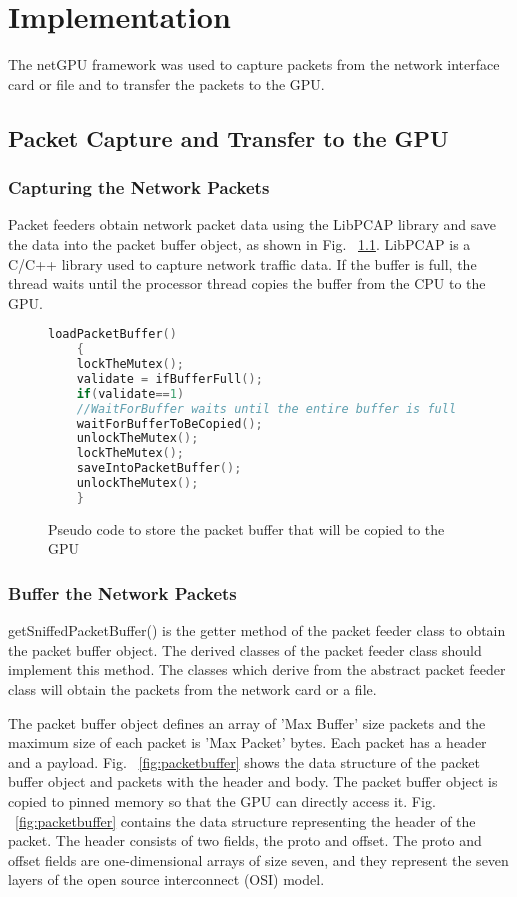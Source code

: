 
\chapter{Implementation}

The netGPU \cite{bib3} framework was used to capture packets from the network interface card or file and to transfer the packets to the GPU.

\section{Packet Capture and Transfer to the GPU}
\vspace{\topsep}
\subsection{Capturing the Network Packets}
Packet feeders obtain network packet data using the LibPCAP library and save the data into the packet buffer object, as shown in Fig. ~\ref{fig:packetfeeder}. LibPCAP \cite{bib4} is a C/C++ library used to capture network traffic data. If the buffer is full, the thread waits until the processor thread copies the buffer from the CPU to the GPU. 

\begin{figure}[H]
	\centering
	\begin{lstlisting}[frame=none,language=C++] 
	loadPacketBuffer()
	{
	lockTheMutex();
	validate = ifBufferFull();
	if(validate==1)
	//WaitForBuffer waits until the entire buffer is full
	waitForBufferToBeCopied();
	unlockTheMutex();
	lockTheMutex();
	saveIntoPacketBuffer();
	unlockTheMutex();
	}
	\end{lstlisting}
	\caption{Pseudo code to store the packet buffer that will be copied to the GPU}
	\label{fig:packetfeeder}
\end{figure}
\squeezeup
\subsection{Buffer the Network Packets}
getSniffedPacketBuffer() is the getter method of the packet feeder class to obtain the packet buffer object. The derived classes of the packet feeder class should implement this method. The classes which derive from the abstract packet feeder class will obtain the packets from the network card or a file.

The packet buffer object defines an array of 'Max Buffer' size packets and the maximum size of each packet is 'Max Packet' bytes. Each packet has a header and a payload. Fig. ~\ref{fig:packetbuffer} shows the data structure of the packet buffer object and  packets with the header and body.
The packet buffer object is copied to pinned memory so that the GPU can directly access it. Fig. ~\ref{fig:packetbuffer} contains the data structure representing the header of the packet. The header consists of two fields, the proto and offset. The proto and offset fields are one-dimensional arrays of size seven, and they represent the seven layers of the open source interconnect (OSI) model.

